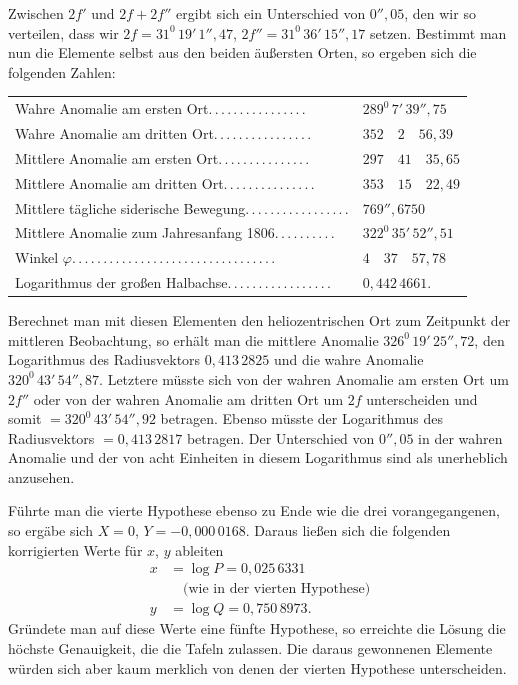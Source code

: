 Zwischen $2f'$ und $2f+2f''$ ergibt sich ein Unterschied von $0''{,}05$, den wir so verteilen, dass
wir $2f=31^0\,19'\,1''{,}47$, $2f''=31^0\,36'\,15''{,}17$ setzen. Bestimmt man nun die Elemente selbst aus den beiden
äußersten Orten, so ergeben sich die folgenden Zahlen:
\begin{center}\begingroup\footnotesize\setlength{\tabcolsep}{3pt}\renewcommand{\arraystretch}{1.3}
\begin{tabular}{ll}
Wahre Anomalie am ersten Ort\quad .\,.\,.\,.\,.\,.\,.\,.\,.\,.\,.\,.\,.\,.\,.\,. & $289^0\,7'\,39''{,}75$\\
Wahre Anomalie am dritten Ort\quad .\,.\,.\,.\,.\,.\,.\,.\,.\,.\,.\,.\,.\,.\,.\,. & $352\quad2\quad56{,}39$\\
Mittlere Anomalie am ersten Ort\quad .\,.\,.\,.\,.\,.\,.\,.\,.\,.\,.\,.\,.\,.\,. & $297\quad41\quad35{,}65$\\
Mittlere Anomalie am dritten Ort\quad .\,.\,.\,.\,.\,.\,.\,.\,.\,.\,.\,.\,.\,.\,. & $353\quad15\quad22{,}49$\\
Mittlere tägliche siderische Bewegung\quad .\,.\,.\,.\,.\,.\,.\,.\,.\,.\,.\,.\,.\,.\,.\,.\,. & $769''{,}6750$\\
Mittlere Anomalie zum Jahresanfang 1806\quad .\,.\,.\,.\,.\,.\,.\,.\,.\,. & $322^0\,35'\,52''{,}51$\\
Winkel $\varphi$\quad .\,.\,.\,.\,.\,.\,.\,.\,.\,.\,.\,.\,.\,.\,.\,.\,.\,.\,.\,.\,.\,.\,.\,.\,.\,.\,.\,.\,.\,.\,.\,.\,. & $4\quad37\quad57{,}78$\\
Logarithmus der großen Halbachse\quad .\,.\,.\,.\,.\,.\,.\,.\,.\,.\,.\,.\,.\,.\,.\,.\,. & $0{,}442\,4661$.
\end{tabular}
\endgroup\end{center}

Berechnet man mit diesen Elementen den heliozentrischen Ort zum Zeitpunkt der mittleren Beobachtung, so erhält man die mittlere Anomalie $326^0\,19'\,25''{,}72$, den Logarithmus des
Radiusvektors $0{,}413\,2825$ und die wahre Anomalie $320^0\,43'\,54''{,}87$. Letztere müsste sich von der  wahren Anomalie am ersten Ort um $2f''$ oder von der wahren Anomalie
am dritten Ort um $2f$ unterscheiden und somit $=320^{0}\,43'\,54''{,}92$ betragen. Ebenso müsste
der Logarithmus des Radiusvektors $=0{,}413\,2817$ betragen. Der Unterschied von $0''{,}05$ in der wahren Anomalie
und der von acht Einheiten in diesem Logarithmus sind als unerheblich anzusehen.

Führte man die vierte Hypothese ebenso zu Ende wie die drei vorangegangenen,
so ergäbe sich $X=0$, $Y=-0{,}000\,0168$. Daraus ließen sich die folgenden korrigierten Werte für $x$, $y$
ableiten
\[
\begin{aligned}x &= \log P = 0{,}025\,6331 \\ &\quad\text{(wie in der vierten Hypothese)}
\\
y &= \log Q = 0{,}750\,8973.
\end{aligned}
\]
\noindent Gründete man auf diese Werte eine fünfte Hypothese, so erreichte die Lösung die höchste
Genauigkeit, die die Tafeln zulassen. Die daraus gewonnenen Elemente würden sich aber
kaum merklich von denen der vierten Hypothese unterscheiden.

